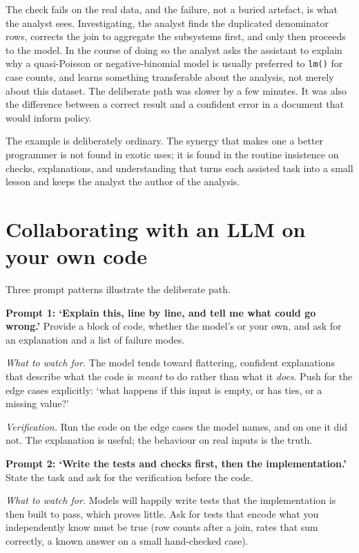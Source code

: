\documentclass[
  letterpaper,
  11pt]{scrbook}
\begin{document}
The check fails on the real data, and the failure, not a buried
artefact, is what the analyst sees. Investigating, the analyst finds the
duplicated denominator rows, corrects the join to aggregate the
subsystems first, and only then proceeds to the model. In the course of
doing so the analyst asks the assistant to explain why a quasi-Poisson
or negative-binomial model is usually preferred to \texttt{lm()} for
case counts, and learns something transferable about the analysis, not
merely about this dataset. The deliberate path was slower by a few
minutes. It was also the difference between a correct result and a
confident error in a document that would inform policy.

The example is deliberately ordinary. The synergy that makes one a
better programmer is not found in exotic uses; it is found in the
routine insistence on checks, explanations, and understanding that turns
each assisted task into a small lesson and keeps the analyst the author
of the analysis.

\section{Collaborating with an LLM on your own
code}\label{collaborating-with-an-llm-on-your-own-code}

Three prompt patterns illustrate the deliberate path.

\textbf{Prompt 1: `Explain this, line by line, and tell me what could go
wrong.'} Provide a block of code, whether the model's or your own, and
ask for an explanation and a list of failure modes.

\emph{What to watch for.} The model tends toward flattering, confident
explanations that describe what the code is \emph{meant} to do rather
than what it \emph{does}. Push for the edge cases explicitly: `what
happens if this input is empty, or has ties, or a missing value?'

\emph{Verification.} Run the code on the edge cases the model names, and
on one it did not. The explanation is useful; the behaviour on real
inputs is the truth.

\textbf{Prompt 2: `Write the tests and checks first, then the
implementation.'} State the task and ask for the verification before the
code.

\emph{What to watch for.} Models will happily write tests that the
implementation is then built to pass, which proves little. Ask for tests
that encode what you independently know must be true (row counts after a
join, rates that sum correctly, a known answer on a small hand-checked
case).
\end{document}
